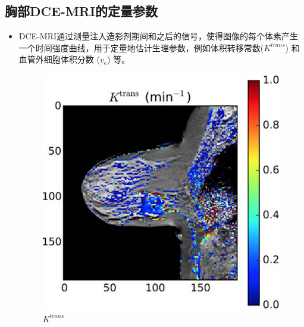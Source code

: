 \documentclass{beamer}
\begin{document}
\subsection{胸部DCE-MRI的定量参数}
\begin{frame}
	\begin{itemize}
		\item DCE-MRI通过测量注入造影剂期间和之后的信号，使得图像的每个体素产生一个时间强度曲线，用于定量地估计生理参数，例如体积转移常数($K^{trans}$) 和血管外细胞体积分数 ($v_e$) 等。
		\begin{figure}[htbp]
\begin{minipage}[t]{0.3\textwidth}
\centering
\includegraphics[width=\textwidth]{ktrans.png}
\\ $K^{trans}$
\end{minipage}
\hspace{1cm}
\begin{minipage}[t]{0.3\textwidth}
\centering

\end{minipage}
\end{figure}
\end{itemize}
\end{frame}
\end{document}
